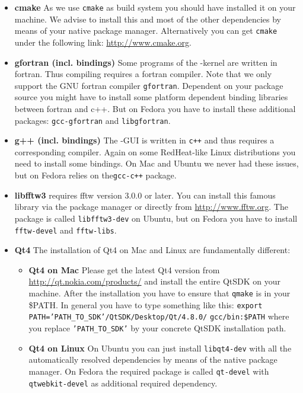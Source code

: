 \begin{itemize}
	\item \textbf{cmake} As we use \texttt{cmake} as build system you should have installed it on your machine. We advise to install this and most of the other dependencies by means of your native package manager. Alternatively you can get \texttt{cmake} under the following link: \url{http://www.cmake.org}.
	 
	\item \textbf{gfortran (incl. bindings)} Some programs of the {\twodx}-kernel are written in fortran. Thus compiling {\twodx} requires a fortran compiler. Note that we only support the GNU fortran compiler \texttt{gfortran}. Dependent on your package source you might have to install some platform dependent binding libraries between fortran and c++. But on Fedora you have to install these additional packages: \texttt{gcc-gfortran} and \texttt{libgfortran}.  
	
	\item \textbf{g++ (incl. bindings)} The {\twodx}-GUI is written in \texttt{c++} and thus requires a corresponding compiler. Again on some RedHeat-like Linux distributions you need to install some bindings. On Mac and Ubuntu we never had these issues, but on Fedora {\twodx} relies on the\texttt{gcc-c++} package.
	
	\item \textbf{libfftw3} {\twodx} requires fftw version 3.0.0 or later. You can install this famous library via the package manager or directly from \url{http://www.fftw.org}. The package is called \texttt{libfftw3-dev} on Ubuntu, but on Fedora you have to install \texttt{fftw-devel} and \texttt{fftw-libs}.

	\item \textbf{Qt4} The installation of Qt4 on Mac and Linux are fundamentally different:
		\begin{itemize}
			\item \textbf{Qt4 on Mac} Please get the latest Qt4 version from \url{http://qt.nokia.com/products/} and install the entire QtSDK on your machine. After the installation you have to ensure that \texttt{qmake} is in your \$PATH. In general you have to type something like this:
			\newline
			\texttt{export PATH='PATH\_TO\_SDK'/QtSDK/Desktop/Qt/4.8.0/} \texttt{gcc/bin:\$PATH} \newline where you replace \texttt{'PATH\_TO\_SDK'} by your concrete QtSDK installation path.
			\item \textbf{Qt4 on Linux} On Ubuntu you can just install \texttt{libqt4-dev} with all the automatically resolved dependencies by means of the native package manager. On Fedora the required package is called \texttt{qt-devel} with \texttt{qtwebkit-devel} as additional required dependency.
		\end{itemize}
\end{itemize}

